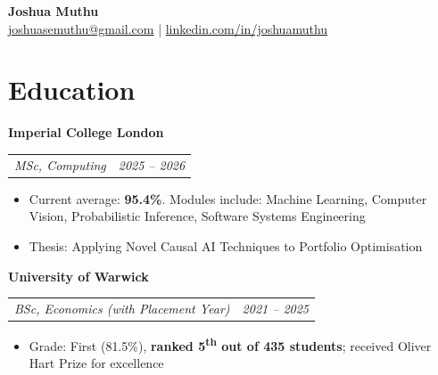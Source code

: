 \documentclass[legalpaper,11pt]{article}
\makeatletter
\newcommand{\resumeSection}[1]{
    \vspace{-9pt}
    \section{#1}
}
\newcommand{\resumeItem}[1]{
  \item\small{#1}
  \vspace{-3pt}
}
\newcommand{\resumeSubheading}[1]{
  \textbf{#1}\\
  \vspace{-1pt}
}
\newcommand{\jobtitleanddate}[2]{
  \begin{tabular*}{0.97\textwidth}{l@{\extracolsep{\fill}}r}
    \textit{\small#1} & \textit{\small#2} \\
  \end{tabular*}\vspace{-4pt}
}
\newcommand{\resumeItemListStart}{\begin{itemize}}
\newcommand{\resumeItemListEnd}{\end{itemize}}
\makeatother
\begin{document}
\textbf{{\Large Joshua Muthu}} \\
\href{mailto:joshuasemuthu@gmail.com}{joshuasemuthu@gmail.com} | \href{https://www.linkedin.com/in/joshuamuthu/}{linkedin.com/in/joshuamuthu}

\resumeSection{Education}
    \resumeSubheading{Imperial College London
    }{}
    \jobtitleanddate{MSc, Computing}{2025 -- 2026}
        \resumeItemListStart
            \resumeItem{Current average: \textbf{95.4\%}. Modules include: Machine Learning, Computer Vision, Probabilistic Inference, Software Systems Engineering}
            \resumeItem{Thesis: Applying Novel Causal AI Techniques to Portfolio Optimisation}
        \resumeItemListEnd
        
    \resumeSubheading{University of Warwick
    }{}
    \jobtitleanddate{BSc, Economics (with Placement Year)}{2021 -- 2025}
      \resumeItemListStart
        \resumeItem{Grade: First (81.5\%), \textbf{ranked 5\textsuperscript{th} out of 435 students}; received Oliver Hart Prize for excellence}
      \resumeItemListEnd
\end{document}
